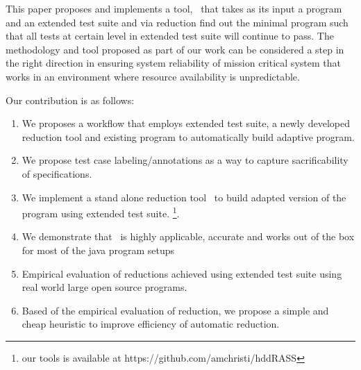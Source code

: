 This paper proposes and implements a tool, \mytool\ that takes as its input a program and an extended test suite and via reduction find out the minimal program such that all tests at certain level in extended test suite will continue to pass. The methodology and tool proposed as part of our work can be considered a step in the right direction in ensuring system reliability of mission critical system that works in an environment where resource availability is unpredictable. %

Our contribution is as follows: 
\begin{enumerate}
\item We proposes a workflow that employs extended test suite, a newly developed reduction tool and existing program to automatically build adaptive program.
\item We propose test case labeling/annotations as a way to capture sacrificability of specifications.
\item We implement a stand alone reduction tool \mytool\, to build adapted version of the program using extended test suite. \footnote{our tools is available at https://github.com/amchristi/hddRASS}.
\item We demonstrate that \mytool\ is highly applicable, accurate and works out of the box for most of the java program setups
\item Empirical evaluation of reductions achieved using extended test suite using real world large open source programs.
\item Based of the empirical evaluation of reduction, we propose a simple and cheap heuristic to improve efficiency of automatic reduction.  
\end{enumerate}      


